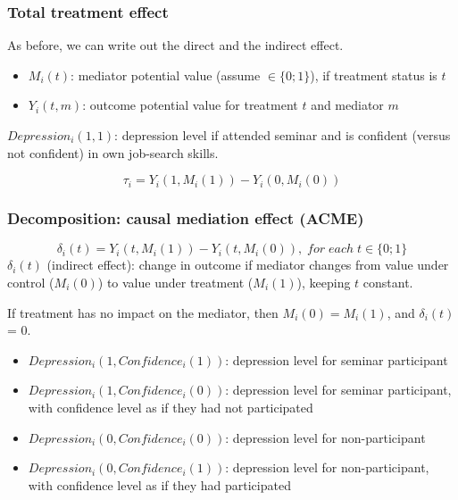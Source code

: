 \documentclass[11pt,english,dvipsnames,aspectratio=169,handout]{beamer}\usepackage[]{graphicx}\usepackage[]{xcolor}
\begin{document}
\begin{frame}
	\frametitle{Total treatment effect}
	As before, we can write out the direct and the indirect effect.\bigskip
	
	\begin{itemize}
		\item $M_i(t)$: mediator potential value (assume $\in \{0;1\}$), if treatment status is $t$
		\item $Y_i(t, m)$: outcome potential value for treatment $t$ and mediator $m$
	\end{itemize}\pause

	$Depression_i(1,1)$: depression level if attended seminar and is confident (versus not confident) in own job-search skills.\pause
	
	\begin{equation}
		\tau_i = Y_i(1, M_i(1)) - Y_i(0, M_i(0))
	\end{equation}
	
\end{frame}


\begin{frame}
	\frametitle{Decomposition: causal mediation effect (ACME)}
	
	\begin{equation}
		\delta_i(t) = Y_i(t, M_i(1)) - Y_i(t, M_i(0)),\; for\; each\; t\in \{0;1\}
	\end{equation}
	\footnotesize
	$\delta_i(t)$ (indirect effect): change in outcome if mediator changes from value under control ($M_i(0)$) to value under treatment ($M_i(1)$), keeping $t$ constant.\bigskip
	\pause
	
	If treatment has no impact on the mediator, then $M_i(0) = M_i(1)$, and $\delta_i(t)$ = 0.\bigskip
	\pause
	
	\begin{itemize}
		\item $Depression_i(1, Confidence_i(1))$: depression level for seminar participant
		\item $Depression_i(1, Confidence_i(0))$: depression level for seminar participant, with confidence level as if they had not participated\pause
		\item $Depression_i(0, Confidence_i(0))$: depression level for non-participant
		\item $Depression_i(0, Confidence_i(1))$: depression level for non-participant, with confidence level as if they had participated
	\end{itemize}
	
\end{frame}
\end{document}
